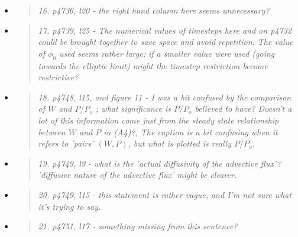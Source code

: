\documentclass[11pt,reqno]{amsart}
\newcommand{\reply}[2]{
\medskip\medskip
\item  \begin{quote}
\emph{#1}
\end{quote}

\medskip
\noindent #2}
\begin{document}
\begin{itemize}
\reply{16. p4736, l20 - the right hand column here seems unnecessary?}
{}

\reply{17. p4739, l25 - The numerical values of timesteps here and on p4732 could be
brought together to save space and avoid repetition. The value of $\phi_0$ used seems
rather large; if a smaller value were used (going towards the elliptic limit) might
the timestep restriction become restrictive?}
{}

\reply{18. p4748, l15, and figure 11 - I was a bit confused by the comparison of $W$ and $P/P_o$ ;
what significance is $P/P_o$ believed to have? Doesn't a lot of this information come
just from the steady state relationship between $W$ and $P$ in (A4)?, The caption is
a bit confusing when it refers to 'pairs' $(W,P)$, but what is plotted is really $P/P_o$.}
{}

\reply{19. p4749, l9 - what is the 'actual diffusivity of the advective flux'?  'diffusive nature of
the advective flux' might be clearer.}
{}

\reply{20. p4749, l15 - this statement is rather vague, and I'm not sure what it's trying to
say.}
{}

\reply{21. p4751, l17 - something missing from this sentence?}
{}
\end{itemize}
\end{document}

